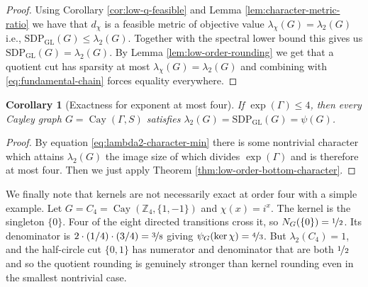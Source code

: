 \documentclass[11pt]{article}
\newtheorem{corollary}[theorem]{Corollary}
\theoremstyle{definition}
\theoremstyle{remark}
\newtheorem{remark}[theorem]{Remark}
\newcommand{\Z}{\mathbb{Z}}
\newcommand{\Cay}{\operatorname{Cay}}
\newcommand{\gl}{\operatorname{SDP_{GL}}}
\begin{document}
\begin{proof}
Using Corollary \ref{cor:low-q-feasible} and Lemma \ref{lem:character-metric-ratio} we have that $d_\chi$ is a feasible metric of objective value $\lambda_\chi(G)=\lambda_2(G)$ i.e., 
$\gl(G)\leq\lambda_2(G)$.  
Together with the spectral lower bound this gives us $\gl(G)=\lambda_2(G)$. By Lemma \ref{lem:low-order-rounding} we get that a quotient cut has sparsity at most $\lambda_\chi(G)=\lambda_2(G)$ and  combining with \eqref{eq:fundamental-chain} forces equality everywhere.
\end{proof}

\begin{corollary}[Exactness for exponent at most four]\label{cor:exp-four-exactness}
If $\exp(\Gamma)\leq 4$, then every Cayley graph $G=\Cay(\Gamma,S)$ satisfies $\lambda_2(G)=\gl(G)=\psi(G)$.
\end{corollary}

\begin{proof}
By equation \eqref{eq:lambda2-character-min} there is some nontrivial character which attains $\lambda_2(G)$ the image size of which divides $\exp(\Gamma)$ and is therefore at most four. Then we just apply Theorem \ref{thm:low-order-bottom-character}.
\end{proof}


We finally note that kernels are not necessarily exact at order four with a simple example. Let $G=C_4=\Cay(\Z_4,\{1,-1\})$ and $\chi(x)=i^x$. The kernel is the singleton $\{0\}$. Four of the eight directed transitions cross it, so $N_G(\{0\})=\nicefrac{1}{2}$. Its denominator is $2 \cdot (1/4) \cdot (3/4)=\nicefrac{3}{8}$ giving $\psi_G(\ker\chi)=\nicefrac{4}{3}$.
But $\lambda_2(C_4)=1$, and the half-circle cut $\{0,1\}$ has numerator and denominator that are both $\nicefrac{1}{2}$ and so the quotient rounding is genuinely stronger than kernel rounding even in the smallest nontrivial case.
\end{document}
